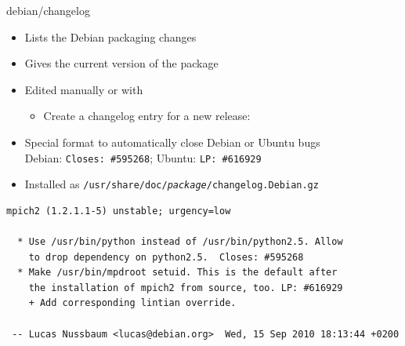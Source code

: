 \documentclass[10pt,final]{beamer}
\begin{document}
\begin{frame}[fragile=singleslide]{debian/changelog}
  \begin{itemize}
  \item Lists the Debian packaging changes
  \item Gives the current version of the package
  \begin{center}
\end{center}


  \item Edited manually or with 
  \begin{itemize}
	  \item Create a changelog entry for a new release: 
  \end{itemize}
  \item Special format to automatically close Debian or Ubuntu bugs\\
    Debian: \texttt{Closes:~\#595268}; Ubuntu: \texttt{LP:~\#616929}
  \item Installed as \texttt{/usr/share/doc/\textit{package}/changelog.Debian.gz}
  \end{itemize}
  \seprule
  \begin{lstlisting}[basicstyle=\ttfamily\footnotesize]
mpich2 (1.2.1.1-5) unstable; urgency=low

  * Use /usr/bin/python instead of /usr/bin/python2.5. Allow
    to drop dependency on python2.5.  Closes: #595268
  * Make /usr/bin/mpdroot setuid. This is the default after
    the installation of mpich2 from source, too. LP: #616929
    + Add corresponding lintian override.

 -- Lucas Nussbaum <lucas@debian.org>  Wed, 15 Sep 2010 18:13:44 +0200
\end{lstlisting}
\end{frame}
\end{document}
